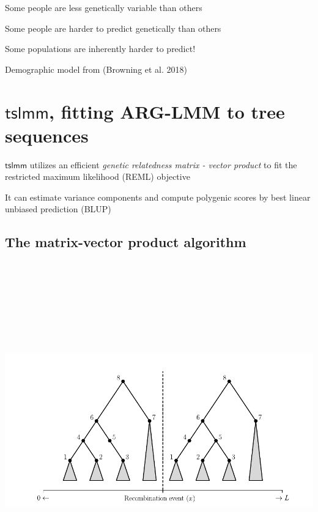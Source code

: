 \documentclass[
  letterpaper,
  DIV=11,
  numbers=noendperiod]{scrartcl}
\begin{document}
Some people are less genetically variable than others

Some people are harder to predict genetically than others

Some populations are {inherently harder} to predict!

Demographic model from (Browning et al. 2018)

\section{\texorpdfstring{\(\textsf{tslmm}\), fitting ARG-LMM to tree
sequences}{\textbackslash textsf\{tslmm\}, fitting ARG-LMM to tree sequences}}\label{textsftslmm-fitting-arg-lmm-to-tree-sequences}

\(\textsf{tslmm}\) utilizes an efficient \emph{genetic relatedness
matrix - vector product} to fit the restricted maximum likelihood (REML)
objective

It can estimate variance components and compute polygenic scores by best
linear unbiased prediction (BLUP)

\subsection{The matrix-vector product
algorithm}\label{the-matrix-vector-product-algorithm}

\begin{center}
\includegraphics[width=\linewidth,height=5.72917in,keepaspectratio]{slides_files/mediabag/imgs/two-trees-empty.pdf}
\end{center}
\end{document}
